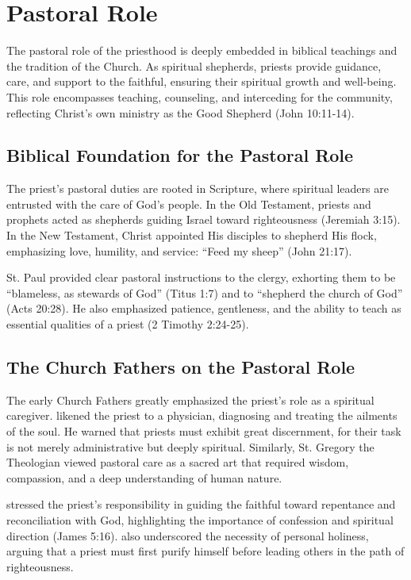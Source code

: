 \documentclass[12pt, doc]{apa7}   	%
\begin{document}
\section{Pastoral Role}\label{pastoral}

The pastoral role of the priesthood is deeply embedded in biblical teachings and the tradition of the Church. As spiritual shepherds, priests provide guidance, care, and support to the faithful, ensuring their spiritual growth and well-being. This role encompasses teaching, counseling, and interceding for the community, reflecting Christ’s own ministry as the Good Shepherd (John 10:11-14).

\subsection{Biblical Foundation for the Pastoral Role}

The priest’s pastoral duties are rooted in Scripture, where spiritual leaders are entrusted with the care of God’s people. In the Old Testament, priests and prophets acted as shepherds guiding Israel toward righteousness (Jeremiah 3:15). In the New Testament, Christ appointed His disciples to shepherd His flock, emphasizing love, humility, and service: ``Feed my sheep'' (John 21:17).

St. Paul provided clear pastoral instructions to the clergy, exhorting them to be ``blameless, as stewards of God'' (Titus 1:7) and to ``shepherd the church of God'' (Acts 20:28). He also emphasized patience, gentleness, and the ability to teach as essential qualities of a priest (2 Timothy 2:24-25).

\subsection{The Church Fathers on the Pastoral Role}

The early Church Fathers greatly emphasized the priest’s role as a spiritual caregiver. \citet{priesthood_chrysostom,complete_work_chrysostom} likened the priest to a physician, diagnosing and treating the ailments of the soul. He warned that priests must exhibit great discernment, for their task is not merely administrative but deeply spiritual. Similarly, St. Gregory the Theologian \citep{early_church_akin} viewed pastoral care as a sacred art that required wisdom, compassion, and a deep understanding of human nature.

\citet{priesthood_shenouda} stressed the priest’s responsibility in guiding the faithful toward repentance and reconciliation with God, highlighting the importance of confession and spiritual direction (James 5:16). \citet{st_basil_letters} also underscored the necessity of personal holiness, arguing that a priest must first purify himself before leading others in the path of righteousness.
\end{document}
